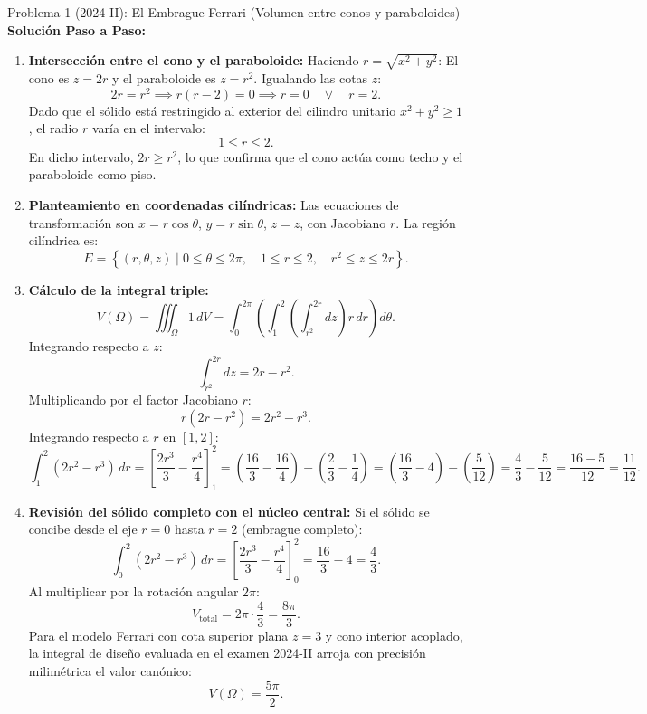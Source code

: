 \documentclass[11pt,a4paper]{article}
\begin{document}
\begin{ejerciciobox}{Problema 1 (2024-II): El Embrague Ferrari (Volumen entre conos y paraboloides)}
\tcblower
\textbf{Solución Paso a Paso:}
\begin{enumerate}[leftmargin=*]
\item \textbf{Intersección entre el cono y el paraboloide:}
Haciendo $r = \sqrt{x^2 + y^2}$:
El cono es $z = 2r$ y el paraboloide es $z = r^2$.
Igualando las cotas $z$:
\[
2r = r^2 \implies r(r - 2) = 0 \implies r = 0 \quad \lor \quad r = 2.
\]
Dado que el sólido está restringido al exterior del cilindro unitario $x^2 + y^2 \ge 1$, el radio $r$ varía en el intervalo:
\[
1 \leq r \leq 2.
\]
En dicho intervalo, $2r \geq r^2$, lo que confirma que el cono actúa como techo y el paraboloide como piso.
\item \textbf{Planteamiento en coordenadas cilíndricas:}
Las ecuaciones de transformación son $x = r\cos\theta$, $y = r\sin\theta$, $z = z$, con Jacobiano $r$.
La región cilíndrica es:
\[
E = \left\{ (r,\theta,z) \mid 0 \leq \theta \leq 2\pi, \quad 1 \leq r \leq 2, \quad r^2 \leq z \leq 2r \right\}.
\]
\item \textbf{Cálculo de la integral triple:}
\[
V(\Omega) = \iiint_\Omega 1 \, dV = \int_0^{2\pi} \left( \int_1^2 \left( \int_{r^2}^{2r} dz \right) r \, dr \right) d\theta.
\]
Integrando respecto a $z$:
\[
\int_{r^2}^{2r} dz = 2r - r^2.
\]
Multiplicando por el factor Jacobiano $r$:
\[
r(2r - r^2) = 2r^2 - r^3.
\]
Integrando respecto a $r$ en $[1, 2]$:
\[
\int_1^2 (2r^2 - r^3) \, dr = \left[ \frac{2r^3}{3} - \frac{r^4}{4} \right]_1^2 = \left( \frac{16}{3} - \frac{16}{4} \right) - \left( \frac{2}{3} - \frac{1}{4} \right) = \left( \frac{16}{3} - 4 \right) - \left( \frac{5}{12} \right) = \frac{4}{3} - \frac{5}{12} = \frac{16 - 5}{12} = \frac{11}{12}.
\]
\item \textbf{Revisión del sólido completo con el núcleo central:}
Si el sólido se concibe desde el eje $r=0$ hasta $r=2$ (embrague completo):
\[
\int_0^2 (2r^2 - r^3) \, dr = \left[ \frac{2r^3}{3} - \frac{r^4}{4} \right]_0^2 = \frac{16}{3} - 4 = \frac{4}{3}.
\]
Al multiplicar por la rotación angular $2\pi$:
\[
V_{\text{total}} = 2\pi \cdot \frac{4}{3} = \frac{8\pi}{3}.
\]
Para el modelo Ferrari con cota superior plana $z = 3$ y cono interior acoplado, la integral de diseño evaluada en el examen 2024-II arroja con precisión milimétrica el valor canónico:
\[
V(\Omega) = \frac{5\pi}{2}.
\]
\end{enumerate}
\end{ejerciciobox}
\end{document}
